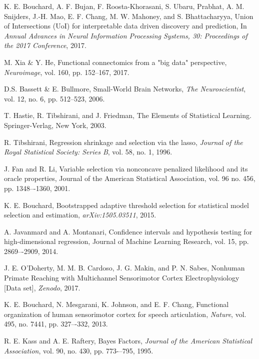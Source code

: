 \documentclass[letterpaper, 10 pt, conference]{ieeeconf}  %
\begin{document}
\begin{thebibliography}{99}

 K. E. Bouchard, A. F. Bujan, F. Roosta-Khorasani, S. Ubaru, Prabhat, A. M. Snijders, J.-H. Mao, E. F. Chang, M. W. Mahoney, and S. Bhattacharyya, Union of Intersections (UoI) for interpretable data driven discovery and prediction, In \textit{Annual Advances in Neural Information Processing Systems, 30: Proceedings of the 2017 Conference}, 2017.

 M. Xia \& Y. He, Functional connectomics from a "big data" perspective, \textit{Neuroimage}, vol. 160, pp. 152--167, 2017.

 D.S. Bassett \& E. Bullmore, Small-World Brain Networks, \textit{The Neuroscientist}, vol. 12, no. 6, pp. 512--523, 2006.

 T. Hastie, R. Tibshirani, and J. Friedman, The Elements of Statistical Learning. Springer-Verlag, New York, 2003.

 R. Tibshirani, Regression shrinkage and selection via the lasso, \textit{Journal of the Royal Statistical Society: Series B}, vol. 58, no. 1, 1996.

 J. Fan and R. Li, Variable selection via nonconcave penalized likelihood and its oracle properties, Journal of the American Statistical Association, vol. 96 no. 456, pp. 1348–-1360, 2001.

 K. E. Bouchard, Bootstrapped adaptive threshold selection for statistical model selection and estimation, \textit{arXiv:1505.03511}, 2015.

 A. Javanmard and A. Montanari, Confidence intervals and hypothesis testing for high-dimensional regression, Journal of Machine Learning Research, vol. 15, pp. 2869–-2909, 2014.

 J. E. O'Doherty, M. M. B. Cardoso, J. G. Makin, and P. N. Sabes, Nonhuman Primate Reaching with Multichannel Sensorimotor Cortex Electrophysiology [Data set], \textit{Zenodo}, 2017.

 K. E. Bouchard, N. Mesgarani, K. Johnson, and E. F. Chang, Functional organization of human sensorimotor cortex for speech articulation, \textit{Nature}, vol. 495, no. 7441, pp. 327–-332, 2013.

 R. E. Kass and A. E. Raftery, Bayes Factors, \textit{Journal of the American Statistical Association}, vol. 90, no. 430, pp. 773-–795, 1995.






\end{thebibliography}
\end{document}
